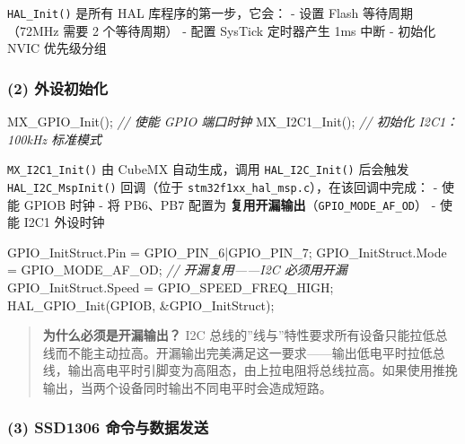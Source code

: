 \documentclass[
  chinese,
  UTF8,
  oneside,
  openany]{ctexbook}
\newenvironment{Shaded}{}{}
\newcommand{\CommentTok}[1]{\textcolor[rgb]{0.38,0.63,0.69}{\textit{#1}}}
\newcommand{\NormalTok}[1]{#1}
\newcommand{\OperatorTok}[1]{\textcolor[rgb]{0.40,0.40,0.40}{#1}}
\begin{document}
\texttt{HAL\_Init()} 是所有 HAL 库程序的第一步，它会： - 设置 Flash
等待周期（72MHz 需要 2 个等待周期） - 配置 SysTick 定时器产生 1ms 中断 -
初始化 NVIC 优先级分组

\subsubsection{(2) 外设初始化}\label{ux5916ux8bbeux521dux59cbux5316-1}

\begin{Shaded}
\begin{Highlighting}[]
\NormalTok{MX\_GPIO\_Init}\OperatorTok{();}          \CommentTok{// 使能 GPIO 端口时钟}
\NormalTok{MX\_I2C1\_Init}\OperatorTok{();}          \CommentTok{// 初始化 I2C1：100kHz 标准模式}
\end{Highlighting}
\end{Shaded}

\texttt{MX\_I2C1\_Init()} 由 CubeMX 自动生成，调用
\texttt{HAL\_I2C\_Init()} 后会触发 \texttt{HAL\_I2C\_MspInit()}
回调（位于 \texttt{stm32f1xx\_hal\_msp.c}），在该回调中完成： - 使能
GPIOB 时钟 - 将 PB6、PB7 配置为
\textbf{复用开漏输出}（\texttt{GPIO\_MODE\_AF\_OD}） - 使能 I2C1
外设时钟

\begin{Shaded}
\begin{Highlighting}[]
\NormalTok{GPIO\_InitStruct}\OperatorTok{.}\NormalTok{Pin }\OperatorTok{=}\NormalTok{ GPIO\_PIN\_6}\OperatorTok{|}\NormalTok{GPIO\_PIN\_7}\OperatorTok{;}
\NormalTok{GPIO\_InitStruct}\OperatorTok{.}\NormalTok{Mode }\OperatorTok{=}\NormalTok{ GPIO\_MODE\_AF\_OD}\OperatorTok{;}   \CommentTok{// 开漏复用——I2C 必须用开漏}
\NormalTok{GPIO\_InitStruct}\OperatorTok{.}\NormalTok{Speed }\OperatorTok{=}\NormalTok{ GPIO\_SPEED\_FREQ\_HIGH}\OperatorTok{;}
\NormalTok{HAL\_GPIO\_Init}\OperatorTok{(}\NormalTok{GPIOB}\OperatorTok{,} \OperatorTok{\&}\NormalTok{GPIO\_InitStruct}\OperatorTok{);}
\end{Highlighting}
\end{Shaded}

\begin{quote}
\textbf{为什么必须是开漏输出？} I2C
总线的''线与''特性要求所有设备只能拉低总线而不能主动拉高。开漏输出完美满足这一要求------输出低电平时拉低总线，输出高电平时引脚变为高阻态，由上拉电阻将总线拉高。如果使用推挽输出，当两个设备同时输出不同电平时会造成短路。
\end{quote}

\subsubsection{(3) SSD1306
命令与数据发送}\label{ssd1306-ux547dux4ee4ux4e0eux6570ux636eux53d1ux9001}
\end{document}
